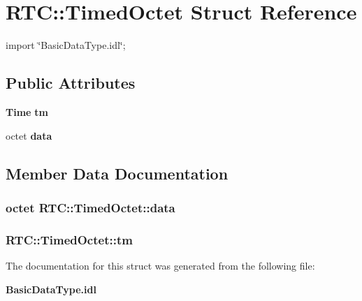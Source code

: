 \section{RTC::TimedOctet Struct Reference}
\label{structRTC_1_1TimedOctet}


{\ttfamily import \char`\"{}BasicDataType.idl\char`\"{};}

\subsection*{Public Attributes}
\begin{DoxyCompactItemize}
\item 
{\bf Time} {\bf tm}
\item 
octet {\bf data}
\end{DoxyCompactItemize}


\subsection{Member Data Documentation}
\subsubsection[{data}]{\setlength{\rightskip}{0pt plus 5cm}octet {\bf RTC::TimedOctet::data}}\label{structRTC_1_1TimedOctet_a6c45f3d01d9f4c3aca20d7f7172cae1d}
\subsubsection[{tm}]{ {\bf RTC::TimedOctet::tm}}\label{structRTC_1_1TimedOctet_af92156b9d60619de75dce6b68c78ca71}


The documentation for this struct was generated from the following file:\begin{DoxyCompactItemize}
\item 
{\bf BasicDataType.idl}\end{DoxyCompactItemize}
